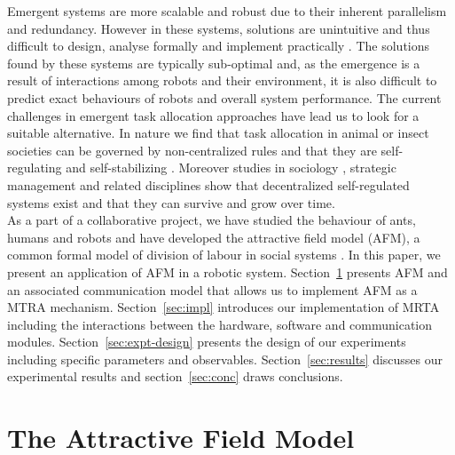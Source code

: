 \documentclass{llncs}
\begin{document}
Emergent systems are more scalable and robust due to their inherent parallelism and redundancy.
However in these systems, solutions are unintuitive and thus difficult to design, analyse formally and implement practically \cite{Gerkey+2004,Lerman+2006}.
The solutions found by these systems are typically sub-optimal and, as the emergence is a result of interactions among robots and their environment, it is also difficult to predict exact behaviours of robots and overall system performance.
The current challenges in emergent task allocation approaches have lead us to look for a suitable alternative.
In nature we find that task allocation in animal or insect societies can be governed by non-centralized rules and that they are self-regulating and self-stabilizing \cite{Bonabeau+1999}.  Moreover studies in sociology \cite{Sayer+1992}, strategic management \cite{Kogut2000} and related disciplines show that decentralized self-regulated systems exist and that they can survive and grow over time.\\
As a part of a collaborative project, we have studied the behaviour of ants, humans and robots and have developed the attractive field model (AFM), a common formal model of division of labour in social systems \cite{Elsa}.
In this paper, we present an application of AFM in a robotic system.
Section~\ref{sec:model} presents AFM and an associated communication model that allows us to implement AFM as a MTRA mechanism.
Section~\ref{sec:impl} introduces our implementation of MRTA including the interactions between the hardware, software and communication modules.
Section~\ref{sec:expt-design} presents the design of our experiments including specific parameters and observables.
Section~\ref{sec:results} discusses our experimental results and section~\ref{sec:conc} draws conclusions.
\section{The Attractive Field Model}
\label{sec:model}
\end{document}
